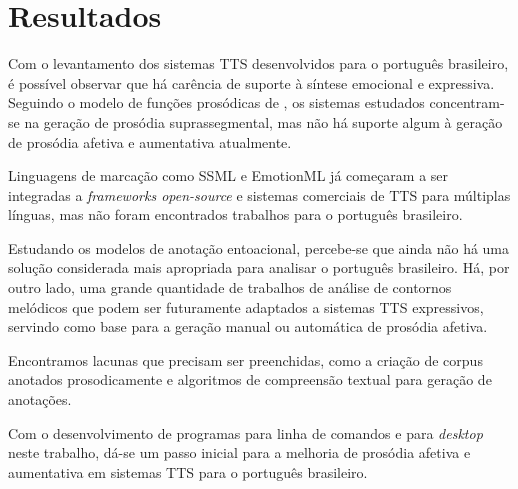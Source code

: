 
\chapter{Resultados}
Com o levantamento dos sistemas TTS desenvolvidos para o português brasileiro, é
possível observar que há carência de suporte à síntese emocional e expressiva.
Seguindo o modelo de funções prosódicas de \cite{taylor2009}, os sistemas
estudados concentram-se na geração de prosódia suprassegmental, mas não há
suporte algum à geração de prosódia afetiva e aumentativa atualmente.

Linguagens de marcação como SSML e EmotionML já começaram a ser integradas a
\emph{frameworks open-source} e sistemas comerciais de TTS para múltiplas
línguas, mas não foram encontrados trabalhos para o português brasileiro.

Estudando os modelos de anotação entoacional, percebe-se que ainda não há uma
solução considerada mais apropriada para analisar o português brasileiro. Há,
por outro lado, uma grande quantidade de trabalhos de análise de contornos
melódicos que podem ser futuramente adaptados a sistemas TTS expressivos,
servindo como base para a geração manual ou automática de prosódia afetiva.

Encontramos lacunas que precisam ser preenchidas, como a criação de corpus
anotados prosodicamente e algoritmos de compreensão textual para geração de
anotações.

Com o desenvolvimento de programas para linha de comandos e para \emph{desktop}
neste trabalho, dá-se um passo inicial para a melhoria de prosódia afetiva e
aumentativa em sistemas TTS para o português brasileiro.